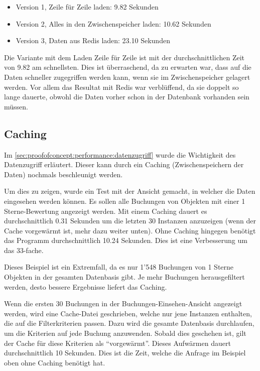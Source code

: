 \begin{itemize}
	\item Version 1, Zeile für Zeile laden: 9.82 Sekunden
	\item Version 2, Alles in den Zwischenspeicher laden: 10.62 Sekunden
	\item Version 3, Daten aus Redis laden: 23.10 Sekunden
\end{itemize}

Die Variante mit dem Laden Zeile für Zeile ist mit der durchschnittlichen Zeit von 9.82 am schnellsten. Dies ist überraschend, da zu erwarten war, dass auf die Daten schneller zugegriffen werden kann, wenn sie im Zwischenspeicher gelagert werden. Vor allem das Resultat mit Redis war verblüffend, da sie doppelt so lange dauerte, obwohl die Daten vorher schon in der Datenbank vorhanden sein müssen.

\subsection{Caching}
\label{sec:proofofconcept:performance:caching}
Im \cref{sec:proofofconcept:performance:datenzugriff} wurde die Wichtigkeit des Datenzugriff erläutert. Dieser kann durch ein Caching (Zwischenspeichern der Daten) nochmals beschleunigt werden. 

Um dies zu zeigen, wurde ein Test mit der Ansicht gemacht, in welcher die Daten eingesehen werden können. Es sollen alle Buchungen von Objekten mit einer 1 Sterne-Bewertung angezeigt werden. Mit einem Caching dauert es durchschnittlich 0.31 Sekunden um die letzten 30 Instanzen anzuzeigen (wenn der Cache vorgewärmt ist, mehr dazu weiter unten). Ohne Caching hingegen benötigt das Programm durchschnittlich 10.24 Sekunden. Dies ist eine Verbesserung um das 33-fache.

Dieses Beispiel ist ein Extremfall, da es nur 1'548 Buchungen von 1 Sterne Objekten in der gesamten Datenbasis gibt. Je mehr Buchungen herausgefiltert werden, desto bessere Ergebnisse liefert das Caching.

Wenn die ersten 30 Buchungen in der Buchungen-Einsehen-Ansicht angezeigt werden, wird eine Cache-Datei geschrieben, welche nur jene Instanzen enthalten, die auf die Filterkriterien passen. Dazu wird die gesamte Datenbasis durchlaufen, um die Kriterien auf jede Buchung anzuwenden. Sobald dies geschehen ist, gilt der Cache für diese Kriterien als "`vorgewärmt"'. 
Dieses Aufwärmen dauert durchschnittlich 10 Sekunden. Dies ist die Zeit, welche die Anfrage im Beispiel oben ohne Caching benötigt hat. 

